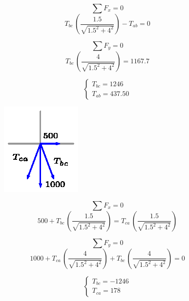 \documentclass[letter,10pt,twoside]{article}
\begin{document}
\begin{equation*}
    \sum{F_x} = 0
\end{equation*}
\begin{equation*}
    T_{bc}\,\left(\frac{1.5}{\sqrt{1.5^2+4^2}}\right) - T_{ab} = 0
\end{equation*}

\begin{equation*}
    \sum{F_y} = 0
\end{equation*}
\begin{equation*}
    T_{bc}\,\left(\frac{4}{\sqrt{1.5^2+4^2}}\right) = 1167.7
\end{equation*}

\begin{equation*}
    \begin{cases}
        T_{bc} = 1246 \\
        T_{ab} = 437.50
    \end{cases}
\end{equation*}

\begin{figure}[H]
\centering
\includegraphics[scale=1.8]{resources/x0403.eps}
\end{figure}

\begin{equation*}
    \sum{F_x} = 0
\end{equation*}
\begin{equation*}
    500 + T_{bc}\,\left(\frac{1.5}{\sqrt{1.5^2+4^2}}\right) = T_{ca}\,\left(\frac{1.5}{\sqrt{1.5^2+4^2}}\right)
\end{equation*}

\begin{equation*}
    \sum{F_y} = 0
\end{equation*}
\begin{equation*}
    1000 + T_{ca}\,\left(\frac{4}{\sqrt{1.5^2+4^2}}\right) + T_{bc}\,\left(\frac{4}{\sqrt{1.5^2+4^2}}\right) = 0
\end{equation*}

\begin{equation*}
    \begin{cases}
        T_{bc} = -1246 \\
        T_{ca} = 178
    \end{cases}
\end{equation*}
\end{document}
